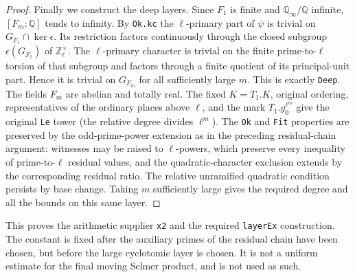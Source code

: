 \begin{proof}
Finally we construct the deep layers. Since $F_1$ is finite
and $\mathbb Q_\infty/\mathbb Q$ infinite,
$[F_m:\mathbb Q]$ tends to infinity. By \texttt{Ok.kc}
the $\ell$-primary part of $\psi$ is trivial on
$G_{F_1}\cap\ker\epsilon$. Its restriction factors continuously
through the closed subgroup $\epsilon(G_{F_1})$ of
$\mathbb Z_\ell^\times$. The $\ell$-primary character is
trivial on the finite prime-to-$\ell$ torsion of that subgroup
and factors through a finite quotient of its principal-unit
part. Hence it is trivial on $G_{F_m}$ for all sufficiently
large $m$. This is exactly \texttt{Deep}. The fields $F_m$
are abelian and totally real. The fixed $K=T_1.K$, original
ordering, representatives of the ordinary places above
$\ell$, and the mark $T_1.g_0^{\ell^m}$ give the original
\texttt{Le} tower (the relative degree divides $\ell^m$).
The \texttt{Ok} and \texttt{Fit} properties are preserved by
the odd-prime-power extension as in the preceding residual-chain
argument: witnesses may be raised to $\ell$-powers,
which preserve every inequality of prime-to-$\ell$ residual
values, and the quadratic-character exclusion extends by
the corresponding residual ratio. The relative unramified
quadratic condition persists by base change.
Taking $m$ sufficiently large gives the required degree
and all the bounds on this same layer.
\end{proof}

This proves the arithmetic supplier \texttt{x2} and the required
\texttt{layerEx} construction. The constant is fixed after the
auxiliary primes of the residual chain have been chosen, but
before the large cyclotomic layer is chosen. It is not a uniform
estimate for the final moving Selmer product, and is not used
as such.
